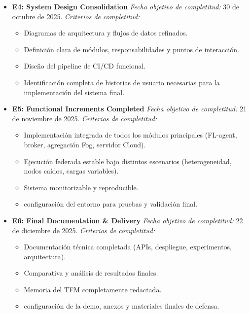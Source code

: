 \documentclass{report}
\begin{document}
\begin{itemize}
    \item \textbf{E4: System Design Consolidation}  
    \textit{Fecha objetivo de completitud:} 30 de octubre de 2025.  
    \textit{Criterios de completitud:}
    \begin{itemize}
        \item Diagramas de arquitectura y flujos de datos refinados.
        \item Definición clara de módulos, responsabilidades y puntos de interacción.
        \item Diseño del pipeline de CI/CD funcional.
        \item Identificación completa de historias de usuario necesarias para la implementación del sistema final.
    \end{itemize}

    \item \textbf{E5: Functional Increments Completed}  
    \textit{Fecha objetivo de completitud:} 21 de noviembre de 2025.  
    \textit{Criterios de completitud:}
    \begin{itemize}
        \item Implementación integrada de todos los módulos principales (FL-agent, broker, agregación Fog, servidor Cloud).
        \item Ejecución federada estable bajo distintos escenarios (heterogeneidad, nodos caídos, cargas variables).
        \item Sistema monitorizable y reproducible.
        \item configuración del entorno para pruebas y validación final.
    \end{itemize}

    \item \textbf{E6: Final Documentation \& Delivery}  
    \textit{Fecha objetivo de completitud:} 22 de diciembre de 2025.  
    \textit{Criterios de completitud:}
    \begin{itemize}
        \item Documentación técnica completada (APIs, despliegue, experimentos, arquitectura).
        \item Comparativa y análisis de resultados finales.
        \item Memoria del TFM completamente redactada.
        \item configuración de la demo, anexos y materiales finales de defensa.
    \end{itemize}

\end{itemize}
\end{document}

